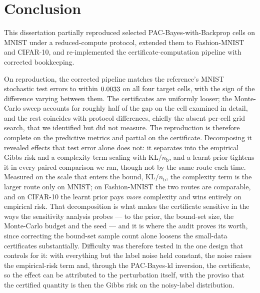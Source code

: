 \section{Conclusion}\label{sec:conclusion}

This dissertation partially reproduced selected PAC-Bayes-with-Backprop cells on
MNIST under a reduced-compute protocol, extended them to Fashion-MNIST and
CIFAR-10, and re-implemented the certificate-computation pipeline with corrected
bookkeeping.

On reproduction, the corrected pipeline matches the reference's MNIST stochastic
test errors to within $0.0033$ on all four target cells, with
the sign of the difference varying between them. The certificates are uniformly
looser; the Monte-Carlo sweep accounts for roughly half of the gap on the cell
examined in detail, and the rest coincides with protocol differences, chiefly the
absent per-cell grid search, that we identified but did not measure. The
reproduction is therefore complete on the predictive metrics and partial on the
certificate. Decomposing it revealed effects that test error alone does not: it
separates into the empirical Gibbs risk and a complexity term scaling with
$\mathrm{KL}/n_{\mathrm b}$, and a learnt prior tightens it in every paired
comparison we ran, though not by the same route each time. Measured
on the scale that enters the bound, $\mathrm{KL}/n_{\mathrm b}$, the complexity
term is the larger route only on MNIST; on Fashion-MNIST the two routes are
comparable, and on CIFAR-10 the learnt prior pays \emph{more} complexity and wins
entirely on empirical risk. That decomposition is what makes the certificate
sensitive in the ways the sensitivity analysis probes --- to the prior, the
bound-set size, the Monte-Carlo budget and the seed --- and it is where the audit
proves its worth, since correcting the bound-set sample count alone loosens the
small-data certificates substantially. Difficulty was
therefore tested in the one design that controls for it: with everything but the
label noise held constant, the noise raises the empirical-risk term and, through
the PAC-Bayes-kl inversion, the certificate, so the effect can be attributed to
the perturbation itself, with the proviso that the certified quantity is then the
Gibbs risk on the noisy-label distribution.

